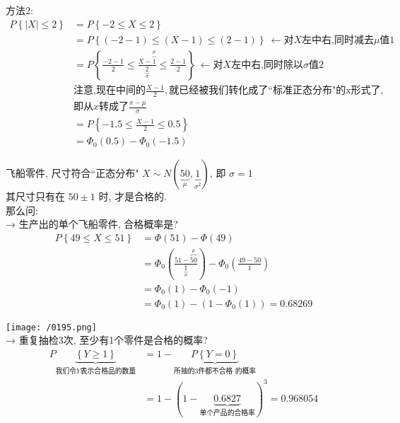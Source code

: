 \documentclass[UTF8]{ctexart}
\begin{document}
\begin{myEnvSample}
方法2: 
\begin{align*}  %
	P\left\{ |X|\leq 2 \right\}
&=P\left\{ -2\leq X\leq 2 \right\}\\
&=P\left\{ \left( -2-1 \right) \leq \left( X-1 \right) \leq \left( 2-1 \right) \right\} \ \gets \text{对}X\text{左中右,同时减去}\mu \text{值}1\\
&=P\left\{ \frac{-2-1}{2}\leq \frac{X-\overset{\mu}{\overbrace{1}}}{\underset{\sigma}{\underbrace{2}}}\leq \frac{2-1}{2} \right\} \ \gets \text{对}X\text{左中右,同时除以}\sigma \text{值}2\\
&\text{注意,现在中间的}\frac{X-1}{2},\text{就已经被我们转化成了``标准正态分布"的x形式了},\\
&\text{即从}x\text{转成了}\frac{x-\mu}{\sigma}\\
&=P\left\{ -1.5\leq \frac{X-1}{2}\leq 0.5 \right\}\\
&=\varPhi _0\left( 0.5 \right) -\varPhi _0\left( -1.5 \right)
\end{align*}

\end{myEnvSample}
\vspace{1em} 




\begin{myEnvSample}
飞船零件, 尺寸符合``正态分布" $X\sim N\left( \underset{\mu}{\underbrace{50}},\underset{\sigma ^2}{\underbrace{1}} \right) $, 即 $\sigma=1$ \\
其尺寸只有在 $50 \pm 1$ 时, 才是合格的. \\

那么问:  \\
→ 生产出的单个飞船零件, 合格概率是? 
\begin{align*}  %
	P\left\{ 49\leq X\leq 51 \right\} 
&=\varPhi \left( 51 \right) -\varPhi \left( 49 \right)\\
&=\varPhi _0\left( \frac{51-\overset{\mu}{\overbrace{50}}}{\underset{\sigma}{\underbrace{1}}} \right) -\varPhi _0\left( \frac{49-50}{1} \right)\\
&=\varPhi _0\left( 1 \right) -\varPhi _0\left( -1 \right)\\
&=\varPhi _0\left( 1 \right) -\left( 1-\varPhi _0\left( 1 \right) \right) =0.68269 
\end{align*}

\texttt{[image: /0195.png]} \\



→ 重复抽检3次, 至少有1个零件是合格的概率?
\begin{align*}  %
	P\underset{\text{我们令}Y\text{表示合格品的数量}}{\underbrace{\left\{ Y\ge 1 \right\} }}
	&=1-\underset{\text{所抽的3件都不合格\ 的概率}}{\underbrace{P\left\{ Y=0 \right\} }}\\
&=1-\left( 1-\underset{\text{单个产品的合格率}}{\underbrace{0.6827}} \right) ^3=0.968054
\end{align*}
\end{myEnvSample}
\vspace{1em} 
\end{document}

